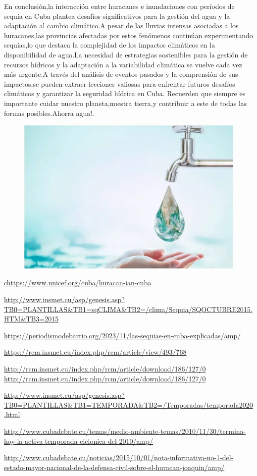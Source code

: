 \documentclass[12pt]{article}
\begin{document}
	
	
	En conclusión,la interacción entre huracanes e inundaciones con períodos de sequía en Cuba plantea desafíos significativos para la gestión del agua y la adaptación al cambio climático.A pesar de las lluvias intensas asociadas a los huracanes,las provincias afectadas por estos fenómenos continúan experimentando sequías,lo que destaca la complejidad de los impactos climáticos en la disponibilidad de agua.La necesidad de estrategias sostenibles para la gestión de recursos hídricos y la adaptación a la variabilidad climática se vuelve cada vez más urgente.A través del análisis de eventos pasados y la comprensión de sus impactos,se pueden extraer lecciones valiosas para enfrentar futuros desafíos climáticos y garantizar la seguridad hídrica en Cuba. Recuerden que siempre es importante cuidar nuestro planeta,nuestra tierra,y contribuir a este de todas las formas posibles.Ahorra agua!.
	
	
	\begin{figure}[H]
		\centering
		\includegraphics[width=0.4\linewidth]{./Report/images/agua}
		\label{fig:agua}
	\end{figure}
	
	
	\newpage
	\begin{thebibliography}{8}
		\url{chttps://www.unicef.org/cuba/huracan-ian-cuba}
		
		\url{http://www.insmet.cu/asp/genesis.asp?TB0=PLANTILLAS&TB1=sqCLIMA&TB2=/clima/Sequia/SQOCTUBRE2015.HTM&TB3=2015}
		
		\url{https://periodismodebarrio.org/2023/11/las-sequias-en-cuba-explicadas/amp/}
		
		\url{https://rcm.insmet.cu/index.php/rcm/article/view/493/768}
		
		\url{http://rcm.insmet.cu/index.php/rcm/article/download/186/127/0
			http://rcm.insmet.cu/index.php/rcm/article/download/186/127/0}
		
		\url{http://www.insmet.cu/asp/genesis.asp?TB0=PLANTILLAS&TB1=TEMPORADA&TB2=/Temporadas/temporada2020.html}
		
		\url{http://www.cubadebate.cu/temas/medio-ambiente-temas/2010/11/30/termina-hoy-la-activa-temporada-ciclonica-del-2010/amp/}
		
		\url{http://www.cubadebate.cu/noticias/2015/10/01/nota-informativa-no-1-del-estado-mayor-nacional-de-la-defensa-civil-sobre-el-huracan-joaquin/amp/}
		
	\end{thebibliography}
	
	
\end{document}
